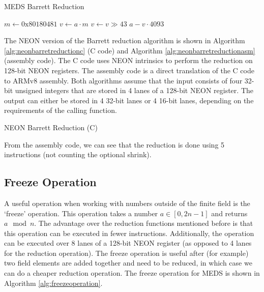 \documentclass[11pt,a4paper]{report}
\theoremstyle{definition}
\begin{document}
\begin{algorithm}
  \caption{MEDS Barrett Reduction}
  \label{alg:barrettreduction}
  \begin{algorithmic}
      \State $m \gets 0\text{x}80180481$
      \State $v \gets a \cdot m$
      \State $v \gets v \gg 43$
      \State \Return $a - v \cdot 4093$
    \EndFunction
  \end{algorithmic}
\end{algorithm}

The NEON version of the Barrett reduction algorithm is shown in Algorithm \ref{alg:neonbarretreductionc} (C code) and Algorithm \ref{alg:neonbarretreductionasm} (assembly code). The C code uses NEON intrinsics to perform the reduction on 128-bit NEON registers. The assembly code is a direct translation of the C code to ARMv8 assembly. Both algorithms assume that the input consists of four 32-bit unsigned integers that are stored in 4 lanes of a 128-bit NEON register. The output can either be stored in 4 32-bit lanes or 4 16-bit lanes, depending on the requirements of the calling function.

\begin{algorithm}
  \caption{NEON Barrett Reduction (C)}
  \label{alg:neonbarretreductionc}
  
\end{algorithm}

\begin{algorithm}
  \caption{NEON Barrett Reduction (Assembly)}
  \label{alg:neonbarretreductionasm}
  Assembler}, style=ASMStyle]{code/barrett_reduce_asm.s}
\end{algorithm}

From the assembly code, we can see that the reduction is done using 5 instructions (not counting the optional shrink).

\subsection{Freeze Operation}
A useful operation when working with numbers outside of the finite field is the `freeze' operation. This operation takes a number $a \in [0, 2n-1]$ and returns $a \mod n$. The advantage over the reduction functions mentioned before is that this operation can be executed in fewer instructions. Additionally, the operation can be executed over 8 lanes of a 128-bit NEON register (as opposed to 4 lanes for the reduction operation). The freeze operation is useful after (for example) two field elements are added together and need to be reduced, in which case we can do a cheaper reduction operation. The freeze operation for MEDS is shown in Algorithm \ref{alg:freezeoperation}.
\end{document}
